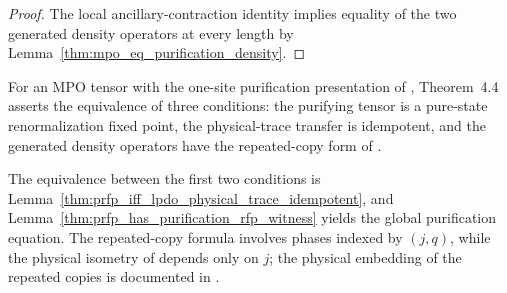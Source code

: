 \begin{proof}\leanok
    The local ancillary-contraction identity implies equality of the two
    generated density operators at every length by
    Lemma~\ref{thm:mpo_eq_purification_density}.
\end{proof}

\begin{lemma}
    \label{thm:cpsv_theorem44_printed_status}
    \notready
    For an MPO tensor with the one-site purification presentation of
    \cite[lines~744--763]{Cirac2016MPDO_arXiv}, Theorem~4.4 asserts the
    equivalence of three conditions: the purifying tensor is a pure-state
    renormalization fixed point, the physical-trace transfer is idempotent, and
    the generated density operators have the repeated-copy form of
    \cite[lines~765--773]{Cirac2016MPDO_arXiv}.

    The equivalence between the first two conditions is
    Lemma~\ref{thm:prfp_iff_lpdo_physical_trace_idempotent}, and
    Lemma~\ref{thm:prfp_has_purification_rfp_witness} yields the global
    purification equation. The repeated-copy formula involves phases indexed by
    $(j,q)$, while the physical isometry of \cite[lines~546--563]{Cirac2016MPDO_arXiv}
    depends only on $j$; the physical embedding of the repeated copies is
    documented in \cite{gap:cpsv16_rfp_isometry_scope}.
\end{lemma}
